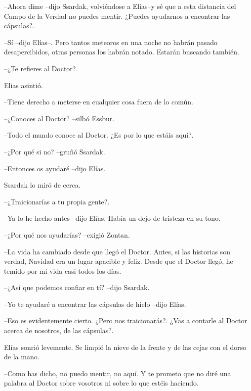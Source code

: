 --Ahora dime --dijo Ssardak, volviéndose a Elías--y sé que a esta distancia del Campo de la Verdad no puedes mentir. ¿Puedes ayudarnos a encontrar las cápsulas?.



--Sí --dijo Elías--. Pero tantos meteoros en una noche no habrán pasado desapercibidos, otras personas los habrán notado. Estarán buscando también.



--¿Te refieres al Doctor?.



Elias asintió. 


--Tiene derecho a meterse en cualquier cosa fuera de lo común.



--¿Conoces al Doctor? --silbó Essbur.



--Todo el mundo conoce al Doctor. ¿Es por lo que estáis aquí?.



--¿Por qué si no? --gruñó Ssardak.



--Entonces os ayudaré --dijo Elías. 


Ssardak lo miró de cerca. 


--¿Traicionarías a tu propia gente?.


--Ya lo he hecho antes --dijo Elías. Había un dejo de tristeza en su tono.



--¿Por qué nos ayudarías? --exigió Zontan.



--La vida ha cambiado desde que llegó el Doctor. Antes, si las historias son verdad, Navidad era un lugar apacible y feliz. Desde que el Doctor llegó, he temido por mi vida casi todos los días. 



--¿Así que podemos confiar en tí? --dijo Ssardak.



--Yo te ayudaré a encontrar las cápsulas de hielo --dijo Elías.



--Eso es evidentemente cierto. ¿Pero nos traicionarás?. ¿Vas a contarle al Doctor acerca de nosotros, de las cápsulas?.



Elías sonrió levemente. Se limpió la nieve de la frente y de las cejas con el dorso de la mano. 


--Como has dicho, no puedo mentir, no aquí. Y te prometo que no diré una palabra al Doctor sobre vosotros ni sobre lo que estéis haciendo.



